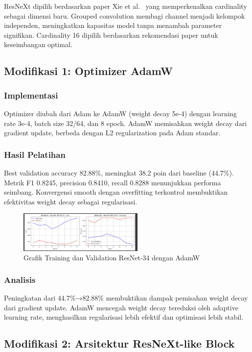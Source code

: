 \documentclass[11pt,a4paper]{article}
\begin{document}
ResNeXt dipilih berdasarkan paper Xie et al.~\cite{xie2017aggregated} yang memperkenalkan cardinality sebagai dimensi baru. Grouped convolution membagi channel menjadi kelompok independen, meningkatkan kapasitas model tanpa menambah parameter signifikan. Cardinality 16 dipilih berdasarkan rekomendasi paper untuk keseimbangan optimal.

\subsection{Modifikasi 1: Optimizer AdamW}
\subsubsection{Implementasi}
Optimizer diubah dari Adam ke AdamW (weight decay 5e-4) dengan learning rate 3e-4, batch size 32/64, dan 8 epoch. AdamW memisahkan weight decay dari gradient update, berbeda dengan L2 regularization pada Adam standar.

\subsubsection{Hasil Pelatihan}
Best validation accuracy 82.88\%, meningkat 38.2 poin dari baseline (44.7\%). Metrik F1 0.8245, precision 0.8410, recall 0.8288 menunjukkan performa seimbang. Konvergensi smooth dengan overfitting terkontrol membuktikan efektivitas weight decay sebagai regularisasi.

\begin{figure}[h]
\centering
\includegraphics[width=0.55\textwidth]{Figure/tahap-3-resnet34-adamw.jpg}
\caption{Grafik Training dan Validation ResNet-34 dengan AdamW}
\label{fig:resnet34-adamw}
\end{figure}

\subsubsection{Analisis}
Peningkatan dari 44.7\%→82.88\% membuktikan dampak pemisahan weight decay dari gradient update. AdamW mencegah weight decay tereduksi oleh adaptive learning rate, menghasilkan regularisasi lebih efektif dan optimisasi lebih stabil.

\subsection{Modifikasi 2: Arsitektur ResNeXt-like Block}
\end{document}
